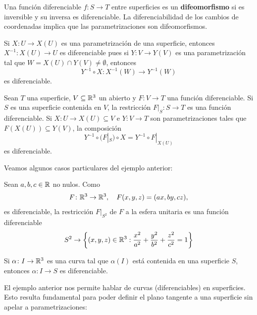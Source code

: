 Una función diferenciable $f\colon S\to T$ entre superficies es un
\textbf{difeomorfismo} si es inversible y su inversa es diferenciable.  La
diferenciabilidad de los cambios de coordenadas implica que las
parametrizaciones son difeomorfismos.

\begin{example}
	Si $X\colon U\to X(U)$ es una parametrización de una superficie, entonces
	$X^{-1}\colon X(U)\to U$ es diferenciable pues si $Y\colon V\to Y(V)$ es
	una parametrización tal que $W=X(U)\cap Y(V)\ne\emptyset$, entonces
	\[
		Y^{-1}\circ X\colon X^{-1}(W)\to Y^{-1}(W)
	\]
	es diferenciable.
\end{example}

\begin{example}
	Sean $T$ una superficie, $V\subseteq\mathbb{R}^3$ un abierto y $F\colon V\to T$ una
	función diferenciable. Si $S$ es una superficie contenida en $V$, la
	restricción $F|_S\colon S\to T$ es una función diferenciable. Si $X\colon
	U\to X(U)\subseteq V$ e $Y\colon V\to T$ son parametrizaciones tales que
	$F(X(U))\subseteq Y(V)$, la composición 
	\[
		Y^{-1}\circ (F|_S)\circ X=Y^{-1}\circ F|_{X(U)}
	\]
	es diferenciable. 
\end{example}

Veamos algunos casos particulares del ejemplo anterior:

\begin{example}
	Sean $a,b,c\in\mathbb{R}$ no nulos. Como 
	\[
		F\colon\mathbb{R}^3\to\mathbb{R}^3,\quad
		F(x,y,z)=(ax,by,cz),
	\]
	es diferenciable, la restricción $F|_{S^2}$ de $F$ a
	la esfera unitaria es una función diferenciable 
	\[
		S^2\to\left\{(x,y,z)\in\mathbb{R}^3:\frac{x^2}{a^2}+\frac{y^2}{b^2}+\frac{z^2}{c^2}=1\right\}
	\]
\end{example}

\begin{example}
	Si $\alpha\colon I\to\mathbb{R}^3$ es una curva tal que $\alpha(I)$ está contenida
	en una superficie $S$, entonces $\alpha\colon I\to S$ es diferenciable.
\end{example}

El ejemplo anterior nos permite hablar de curvas (diferenciables) en
superficies. Esto resulta fundamental para poder definir el plano tangente a una superficie
sin apelar a parametrizaciones:
%
%
%

